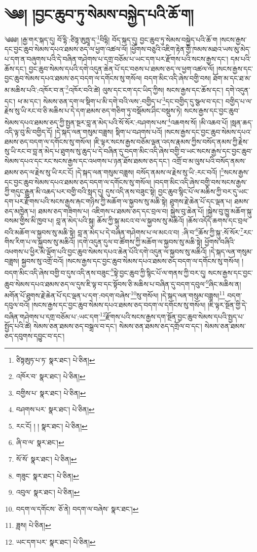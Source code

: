 \setcounter{footnote}{0} 
\chapter{༄༅། །བྱང་ཆུབ་ཏུ་སེམས་བསྐྱེད་པའི་ཆོ་ག།}༄༅༅། །རྒྱ་གར་སྐད་དུ། བོ་དྷི་:ཙིཏྟ་ཨུཏྤཱ་ད་\footnote{ཙིཏྟཨུཏ་པ་ཏ་  སྣར་ཐང་།  པེ་ཅིན། }བིདྷི། བོད་སྐད་དུ། བྱང་ཆུབ་ཏུ་སེམས་བསྐྱེད་པའི་ཆོ་ག །སངས་རྒྱས་དང་བྱང་ཆུབ་སེམས་དཔའ་ཐམས་ཅད་ལ་ཕྱག་འཚལ་ལོ། །ཕྱོགས་བཅུའི་འཇིག་རྟེན་གྱི་ཁམས་མཐའ་ཡས་མུ་མེད་པ་དག་ན་བཞུགས་པའི་དེ་བཞིན་གཤེགས་པ་དགྲ་བཅོམ་པ་ཡང་དག་པར་རྫོགས་པའི་སངས་རྒྱས་དང་། དམ་པའི་ཆོས་དང་། བྱང་ཆུབ་སེམས་དཔའི་དགེ་འདུན་ཆེན་པོ་དང་བཅས་པ་ཐམས་ཅད་ལ་ཕྱག་འཚལ་ལོ། །སངས་རྒྱས་དང་བྱང་ཆུབ་སེམས་དཔའ་ཐམས་ཅད་བདག་ལ་དགོངས་སུ་གསོལ། བདག་མིང་འདི་ཞེས་བགྱི་བས། ཐོག་མ་དང་ཐ་མ་མ་མཆིས་པའི་:འཁོར་བ་ན་\footnote{འཁོར་བ་  སྣར་ཐང་།  པེ་ཅིན། }འཁོར་བའི་ཚེ། ལུས་དང་ངག་དང་ཡིད་ཀྱིས། སངས་རྒྱས་དང་ཆོས་དང་། དགེ་འདུན་དང་། ཕ་མ་དང་། སེམས་ཅན་དག་ལ་སྡིག་པ་མི་དགེ་བའི་ལས་:བགྱིད་པ་\footnote{བགྱིས་པ་  སྣར་ཐང་།  པེ་ཅིན། }དང་བགྱིད་དུ་སྩལ་བ་དང་། བགྱིད་པ་ལ་རྗེས་སུ་ཡི་རང་བ་ཅི་མཆིས་པ་དེ་དག་ཐམས་ཅད་གཅིག་ཏུ་བསྡོམས་ཤིང་བསྡུས་ཏེ། སངས་རྒྱས་དང་བྱང་ཆུབ་སེམས་དཔའ་ཐམས་ཅད་ཀྱི་སྤྱན་སྔར་བླ་ན་མེད་པའི་སོ་སོར་:བཤགས་པས་\footnote{བཤགས་པར་  སྣར་ཐང་།  པེ་ཅིན། }འཆགས་སོ། །མི་འཆབ་པོ། །སླན་ཆད་འདི་ལྟ་བུ་མི་བགྱིད་དོ། །དེ་སྐད་ལན་གསུམ་བཟླས། སྡིག་པ་བཤགས་པའོ། །སངས་རྒྱས་དང་བྱང་ཆུབ་སེམས་དཔའ་ཐམས་ཅད་བདག་ལ་དགོངས་སུ་གསོལ། །ཇི་ལྟར་སངས་རྒྱས་བཅོམ་ལྡན་འདས་རྣམས་ཀྱིས་བསོད་ནམས་ཀྱི་རྗེས་སུ་ཡི་རང་བ་བླ་ན་མེད་པ་ཐུགས་སུ་ཆུད་པ་དེ་བཞིན་དུ་བདག་མིང་འདི་ཞེས་བགྱི་བ་ཡང་སངས་རྒྱས་དང་བྱང་ཆུབ་སེམས་དཔའ་དང་རང་སངས་རྒྱས་དང་འཕགས་པ་ཉན་ཐོས་ཐམས་ཅད་དང་། འགྲོ་བ་མ་ལུས་པའི་བསོད་ནམས་ཐམས་ཅད་ལ་རྗེས་སུ་ཡི་རང་ངོ། །དེ་སྐད་ལན་གསུམ་བཟླས། བསོད་ནམས་ལ་རྗེས་སུ་ཡི་:རང་བའོ། །\footnote{རང་ངོ། ། །  སྣར་ཐང་།  པེ་ཅིན། }སངས་རྒྱས་དང་བྱང་ཆུབ་སེམས་དཔའ་ཐམས་ཅད་བདག་ལ་དགོངས་སུ་གསོལ། །བདག་མིང་འདི་ཞེས་བགྱི་བས་སངས་རྒྱས་ཀྱི་གདུང་རྒྱུན་མི་འཆད་པར་བགྱི་བའི་སླད་དུ། དུས་འདི་ནས་བཟུང་སྟེ། བྱང་ཆུབ་སྙིང་པོ་ལ་མཆིས་ཀྱི་བར་དུ་ཡང་དག་པར་རྫོགས་པའི་སངས་རྒྱས་རྐང་གཉིས་ཀྱི་མཆོག་ལ་སྐྱབས་སུ་མཆི་སྟེ། ཐུགས་རྗེ་ཆེན་པོ་དང་ལྡན་པ། ཐམས་ཅད་མཁྱེན་པ། ཐམས་ཅད་གཟིགས་པ། འཇིགས་པ་ཐམས་ཅད་དང་བྲལ་བ། སྐྱེས་བུ་ཆེན་པོ། །སྐྱེས་བུ་ཁྱུ་མཆོག་སྐུ་བསམ་གྱིས་མི་ཁྱབ་པ། བླ་ན་མེད་པའི་སྐུ། ཆོས་ཀྱི་སྐུ་མངའ་བ་ལ་སྐྱབས་སུ་མཆིའོ། །ཆོས་འདོད་ཆགས་དང་བྲལ་བའི་མཆོག་ལ་སྐྱབས་སུ་མཆི་སྟེ། བླ་ན་མེད་པ་དེ་བཞིན་གཤེགས་པ་ལ་མངའ་བ། :ཞི་བ་\footnote{ཞི་བ་ལ་  སྣར་ཐང་། }ཆོས་ཀྱི་སྐུ་:སོ་སོར་\footnote{སོ་སོ་  སྣར་ཐང་།  པེ་ཅིན། }རང་གིས་རིག་པ་ལ་སྐྱབས་སུ་མཆིའོ། །དགེ་འདུན་དུལ་བ་ཚོགས་ཀྱི་མཆོག་ལ་སྐྱབས་སུ་མཆི་སྟེ། ཕྱོགས་བཞིའི་འཕགས་པ་ཕྱིར་མི་ལྡོག་པའི་བྱང་ཆུབ་སེམས་དཔའ་ཆེན་པོའི་དགེ་འདུན་ལ་སྐྱབས་སུ་མཆིའོ། །དེ་སྐད་ལན་གསུམ་བཟླས། སྐྱབས་སུ་འགྲོ་བའོ། །སངས་རྒྱས་དང་བྱང་ཆུབ་སེམས་དཔའ་ཐམས་ཅད་བདག་ལ་དགོངས་སུ་གསོལ། །བདག་མིང་འདི་ཞེས་བགྱི་བ་དུས་འདི་ནས་བཟུང་\footnote{གཟུང་  སྣར་ཐང་།  པེ་ཅིན། }སྟེ་བྱང་ཆུབ་ཀྱི་སྙིང་པོ་ལ་གནས་ཀྱི་བར་དུ། སངས་རྒྱས་དང་བྱང་ཆུབ་སེམས་དཔའ་ཐམས་ཅད་ལ་དུས་ཇི་ལྟ་བ་དང་སྟོབས་ཅི་མཆིས་པ་བཞིན་དུ་བདག་དབུལ་\footnote{འབུལ་  སྣར་ཐང་།  པེ་ཅིན། }ཞིང་མཆིས་ན། མགོན་པོ་ཐུགས་རྗེ་ཆེན་པོ་དང་ལྡན་པ་དག་:བདག་བཞེས་\footnote{བདག་ལ་དགོངས་  ཅོ་ནེ། བདག་ལ་བཞེས་  སྣར་ཐང་། }སུ་གསོལ། །དེ་སྐད་ལན་གསུམ་བཟླས།\footnote{ཟླས།  པེ་ཅིན། } བདག་དབུལ་བའོ། །སངས་རྒྱས་དང་བྱང་ཆུབ་སེམས་དཔའ་ཐམས་ཅད་བདག་ལ་དགོངས་སུ་གསོལ། །ཇི་ལྟར་སྔོན་གྱི་དེ་བཞིན་གཤེགས་པ་དགྲ་བཅོམ་པ་:ཡང་དག་\footnote{ཡང་དག་པར་  སྣར་ཐང་།  པེ་ཅིན། }རྫོགས་པའི་སངས་རྒྱས་དག་སྔོན་བྱང་ཆུབ་སེམས་དཔའི་སྤྱད་པ་སྤྱོད་པའི་ཚེ། སེམས་ཅན་ཐམས་ཅད་བསྒྲལ་བ་དང་། སེམས་ཅན་ཐམས་ཅད་དགྲོལ་བ་དང་། སེམས་ཅན་ཐམས་ཅད་དབུགས་དབྱུང་བ་དང་། 